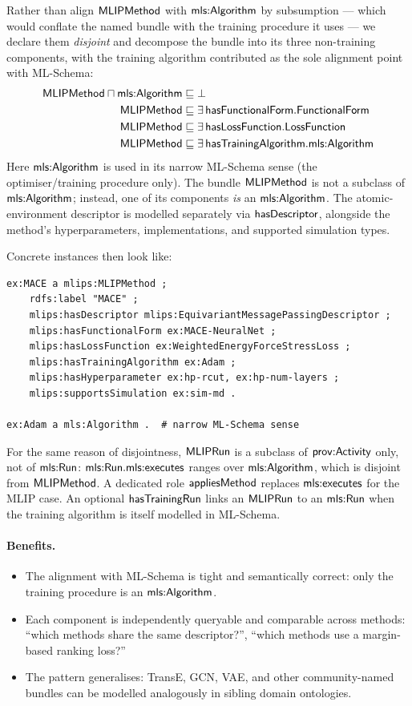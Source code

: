Rather than align $\mathsf{MLIPMethod}$ with $\mathsf{mls{:}Algorithm}$ by subsumption
--- which would conflate the named bundle with the training procedure
it uses --- we declare them \emph{disjoint} and decompose the bundle
into its three non-training components, with the training algorithm
contributed as the sole alignment point with ML-Schema:
%
\begin{align*}
  \mathsf{MLIPMethod} \sqcap \mathsf{mls{:}Algorithm} &\sqsubseteq \bot \\
  \mathsf{MLIPMethod} &\sqsubseteq \exists\, \mathsf{hasFunctionalForm}.\mathsf{FunctionalForm} \\
  \mathsf{MLIPMethod} &\sqsubseteq \exists\, \mathsf{hasLossFunction}.\mathsf{LossFunction} \\
  \mathsf{MLIPMethod} &\sqsubseteq \exists\, \mathsf{hasTrainingAlgorithm}.\mathsf{\mathsf{mls{:}Algorithm}}
\end{align*}
%
Here $\mathsf{mls{:}Algorithm}$ is used in its narrow ML-Schema sense (the
optimiser/training procedure only). The bundle $\mathsf{MLIPMethod}$ is not a
subclass of $\mathsf{mls{:}Algorithm}$; instead, one of its components \emph{is}
an $\mathsf{mls{:}Algorithm}$. The atomic-environment descriptor is modelled
separately via $\mathsf{hasDescriptor}$, alongside the method's hyperparameters,
implementations, and supported simulation types.

Concrete instances then look like:
%
\begin{lstlisting}[language=turtle]
ex:MACE a mlips:MLIPMethod ;
    rdfs:label "MACE" ;
    mlips:hasDescriptor mlips:EquivariantMessagePassingDescriptor ;
    mlips:hasFunctionalForm ex:MACE-NeuralNet ;
    mlips:hasLossFunction ex:WeightedEnergyForceStressLoss ;
    mlips:hasTrainingAlgorithm ex:Adam ;
    mlips:hasHyperparameter ex:hp-rcut, ex:hp-num-layers ;
    mlips:supportsSimulation ex:sim-md .

ex:Adam a mls:Algorithm .  # narrow ML-Schema sense
\end{lstlisting}

For the same reason of disjointness, $\mathsf{MLIPRun}$ is a subclass of
$\mathsf{prov{:}Activity}$ only, not of $\mathsf{mls{:}Run}$: $\mathsf{mls{:}Run}.\mathsf{mls{:}executes}$
ranges over $\mathsf{mls{:}Algorithm}$, which is disjoint from $\mathsf{MLIPMethod}$. A
dedicated role $\mathsf{appliesMethod}$ replaces $\mathsf{mls{:}executes}$ for the MLIP
case. An optional $\mathsf{hasTrainingRun}$ links an $\mathsf{MLIPRun}$ to an
$\mathsf{mls{:}Run}$ when the training algorithm is itself modelled in
ML-Schema.

\paragraph{Benefits.}
\begin{itemize}
\item The alignment with ML-Schema is tight and semantically correct:
  only the training procedure is an $\mathsf{mls{:}Algorithm}$.
\item Each component is independently queryable and comparable across
  methods: ``which methods share the same descriptor?'', ``which
  methods use a margin-based ranking loss?''
\item The pattern generalises: TransE, GCN, VAE, and other
  community-named bundles can be modelled analogously in sibling
  domain ontologies.
\end{itemize}

